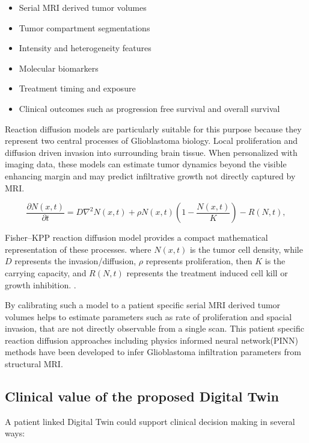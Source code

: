 \begin{itemize}
    \item Serial MRI derived tumor volumes
    \item Tumor compartment segmentations
    \item Intensity and heterogeneity features
    \item Molecular biomarkers
    \item Treatment timing and exposure
    \item Clinical outcomes such as progression free survival and overall survival
\end{itemize}

Reaction diffusion models are particularly suitable for this purpose because they represent two central processes of Glioblastoma biology. Local proliferation and diffusion driven invasion into surrounding brain tissue. When personalized with imaging data, these models can estimate tumor dynamics beyond the visible enhancing margin and may predict infiltrative growth not directly captured by MRI.


\begin{equation}
    \frac{\partial N(x,t)}{\partial t} = D \nabla^2 N(x,t) + \rho N(x,t)\left(1 - \frac{N(x,t)}{K}\right) - R(N,t),
    \label{eq:fisher_kpp_custom}
\end{equation}

Fisher–KPP reaction diffusion model provides a compact mathematical representation of these processes. where $N(x,t)$ is the tumor cell density, while $D$ represents the invasion/diffusion, $\rho$ represents proliferation, then $K$ is the carrying capacity, and $R(N,t)$ represents the treatment induced cell kill or growth inhibition. \cite{fritz2025timefractional}.

By calibrating such a model to a patient specific serial MRI derived tumor volumes helps to estimate parameters such as rate of proliferation and spacial invasion, that are not directly observable from a single scan. This patient specific reaction diffusion approaches including physics informed neural network(PINN) methods have been developed to infer Glioblastoma infiltration parameters from structural MRI.

\subsection{Clinical value of the proposed Digital Twin}

A patient linked Digital Twin could support clinical decision making in several ways:

